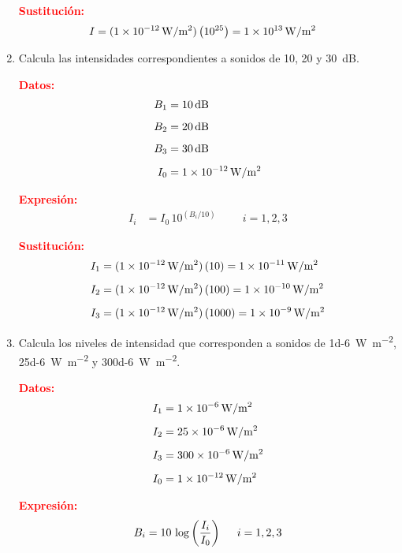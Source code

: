 \documentclass[14pt]{extarticle}
\newcommand{\textocolor}[2]{\textbf{\textcolor{#1}{#2}}}
\begin{document}
\begin{enumerate}
\textocolor{red}{Sustitución:}
\begin{align*}
I &= (\SI{1d-12}{\watt\per\square\meter}) \left( 10^{25} \right) = \SI{1d13}{\watt\per\square\meter}
\end{align*}
\item Calcula las intensidades correspondientes a sonidos de \num{10}, \num{20} y \SI{30}{\dB}.

\begin{minipage}[t]{0.4\linewidth}
\textocolor{red}{Datos:}
\begin{align*}
B_{1} &= \SI{10}{\dB} \\[0.5em]
B_{2} &= \SI{20}{\dB} \\[0.5em]
B_{3} &= \SI{30}{\dB} \\[0.5em]
I_{0} &= \SI{1d-12}{\watt\per\square\meter}
\end{align*}
\end{minipage}
\hspace{0.4cm}
\begin{minipage}[t]{0.4\linewidth}
\textocolor{red}{Expresión:}
\begin{align*}
I_{i} &= I_{0} \, 10^{(B_{i}/10)} \hspace{1cm} i = 1, 2, 3
\end{align*}
\end{minipage}

\textocolor{red}{Sustitución:}
\begin{align*}
I_{1} &= (\SI{1d-12}{\watt\per\square\meter}) \left( 10 \right) = \SI{1d-11}{\watt\per\square\meter} \\[0.5em]
I_{2} &= (\SI{1d-12}{\watt\per\square\meter}) \left( 100 \right) = \SI{1d-10}{\watt\per\square\meter} \\[0.5em]
I_{3} &= (\SI{1d-12}{\watt\per\square\meter}) \left( 1000 \right) = \SI{1d-9}{\watt\per\square\meter}
\end{align*}
\item Calcula los niveles de intensidad que corresponden a sonidos de \SI{1d-6}{\watt\per\square\meter}, \SI{25d-6}{\watt\per\square\meter} y \SI{300d-6}{\watt\per\square\meter}.

\begin{minipage}[t]{0.4\linewidth}
\textocolor{red}{Datos:}
\begin{align*}
I_{1} &= \SI{1d-6}{\watt\per\square\meter} \\[0.5em]
I_{2} &= \SI{25d-6}{\watt\per\square\meter} \\[0.5em]
I_{3} &= \SI{300d-6}{\watt\per\square\meter} \\[0.5em]
I_{0} &= \SI{1d-12}{\watt\per\square\meter}
\end{align*}
\end{minipage}
\hspace{0.4cm}
\begin{minipage}[t]{0.4\linewidth}
\textocolor{red}{Expresión:}
\begin{align*}
B_{i} = 10 \, \log \left( \dfrac{I_{i}}{I_{0}} \right) \hspace{0.5cm} i = 1, 2, 3
\end{align*}
\end{minipage}


\end{enumerate}
\end{document}

